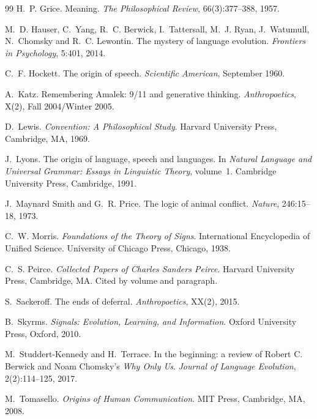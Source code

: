 \documentclass[11pt]{article}
\begin{document}
\begin{thebibliography}{99}
H.~P. Grice.
\newblock Meaning.
\newblock \emph{The Philosophical Review}, 66(3):377--388, 1957.

M.~D. Hauser, C.~Yang, R.~C. Berwick, I.~Tattersall, M.~J. Ryan, J.~Watumull,
  N.~Chomsky and R.~C. Lewontin.
\newblock The mystery of language evolution.
\newblock \emph{Frontiers in Psychology}, 5:401, 2014.

C.~F. Hockett.
\newblock The origin of speech.
\newblock \emph{Scientific American}, September 1960.

A.~Katz.
\newblock Remembering Amalek: 9/11 and generative thinking.
\newblock \emph{Anthropoetics}, X(2), Fall 2004/Winter 2005.

D.~Lewis.
\newblock \emph{Convention: A Philosophical Study}.
\newblock Harvard University Press, Cambridge, MA, 1969.

J.~Lyons.
\newblock The origin of language, speech and languages.
\newblock In \emph{Natural Language and Universal Grammar: Essays in Linguistic
  Theory}, volume~1. Cambridge University Press, Cambridge, 1991.

J.~Maynard Smith and G.~R. Price.
\newblock The logic of animal conflict.
\newblock \emph{Nature}, 246:15--18, 1973.

C.~W. Morris.
\newblock \emph{Foundations of the Theory of Signs}.
\newblock International Encyclopedia of Unified Science. University of Chicago Press,
  Chicago, 1938.

C.~S. Peirce.
\newblock \emph{Collected Papers of Charles Sanders Peirce}.
\newblock Harvard University Press, Cambridge, MA. Cited by volume and paragraph.

S.~Sackeroff.
\newblock The ends of deferral.
\newblock \emph{Anthropoetics}, XX(2), 2015.

B.~Skyrms.
\newblock \emph{Signals: Evolution, Learning, and Information}.
\newblock Oxford University Press, Oxford, 2010.

M.~Studdert-Kennedy and H.~Terrace.
\newblock In the beginning: a review of Robert C. Berwick and Noam Chomsky's
  \emph{Why Only Us}.
\newblock \emph{Journal of Language Evolution}, 2(2):114--125, 2017.

M.~Tomasello.
\newblock \emph{Origins of Human Communication}.
\newblock MIT Press, Cambridge, MA, 2008.

\end{thebibliography}
\end{document}

